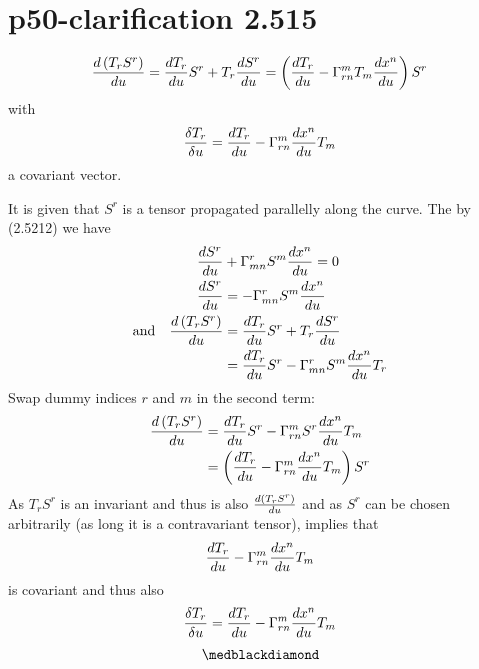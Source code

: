 \section{p50-clarification 2.515 }
\begin{tcolorbox}
$$\dv{\left(T_rS^r\right)}{u} = \dv{T_r}{u}S^r + T_r\dv{S^r}{u} = \left(\dv{T_r}{u} - \Gamma^m_{rn}T_m\dv{x^n}{u}\right)S^r$$ with $$\frac{\delta T_r}{\delta u} = \dv{T_r}{u} -\Gamma^m_{rn}\dv{x^n}{u} T_m$$ a covariant vector.
\end{tcolorbox}
It is given that $S^r$ is a tensor propagated parallelly along the curve. The by (2.5212) we have
\begin{align}
\dv{S^r}{u} &+ \Gamma^r_{mn}S^m\dv{x^n}{u}= 0\\
\dv{S^r}{u} &= - \Gamma^r_{mn}S^m\dv{x^n}{u}\\
\text{and}\quad \dv{\left(T_rS^r\right)}{u} &= \dv{T_r}{u}S^r + T_r\dv{S^r}{u} \\
\ &= \dv{T_r}{u}S^r -\Gamma^r_{mn}S^m\dv{x^n}{u} T_r\\
\end{align}
Swap dummy indices $r$ and $m$ in the second term:
\begin{align}
\dv{\left(T_rS^r\right)}{u} &= \dv{T_r}{u}S^r -\Gamma^m_{rn}S^r\dv{x^n}{u} T_m\\
\ &= \left(\dv{T_r}{u} -\Gamma^m_{rn}\dv{x^n}{u} T_m\right)S^r\\
\end{align}
As $T_rS^r$ is an invariant and thus is also $\dv{\left(T_rS^r\right)}{u}$ and as $S^r$ can be chosen arbitrarily (as long it is a contravariant tensor), implies that $$\dv{T_r}{u} -\Gamma^m_{rn}\dv{x^n}{u} T_m$$ is covariant and thus also $$\frac{\delta T_r}{\delta u} = \dv{T_r}{u} -\Gamma^m_{rn}\dv{x^n}{u} T_m$$
$$\medblackdiamond$$
\newpage

